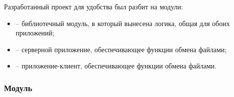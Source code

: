 
Разработанный проект  для удобства был разбит на модули:
\begin{itemize}
	\item {} -- библиотечный модуль, в который вынесена логика, общая для обоих приложений;
	\item {} -- серверной приложение, обеспечивающее функции обмена файлами;
	\item {} -- приложение-клиент, обеспечивающее функции обмена файлами.
\end{itemize}

\subsubsection{Модуль }

